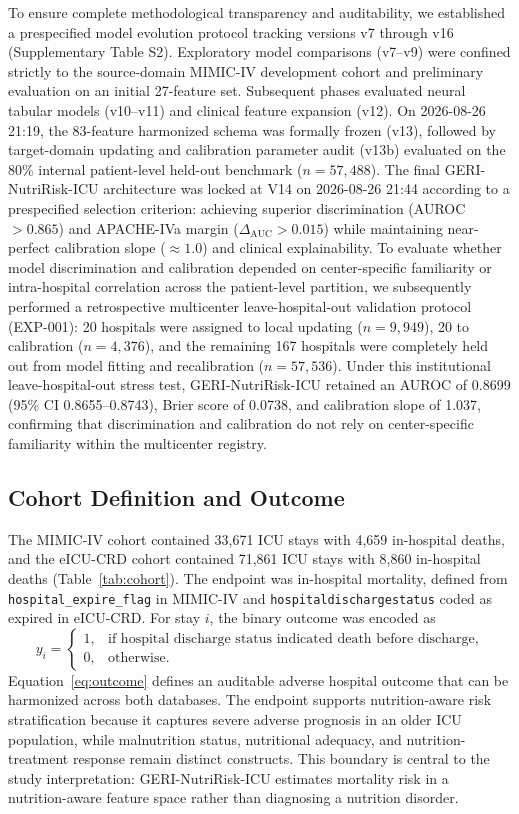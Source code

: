 \documentclass[utf8]{FrontiersinVancouver}
\newcommand{\re}[1]{#1}
\begin{document}
\re{To ensure complete methodological transparency and auditability, we established a prespecified model evolution protocol tracking versions v7 through v16 (Supplementary Table S2). Exploratory model comparisons (v7--v9) were confined strictly to the source-domain MIMIC-IV development cohort and preliminary evaluation on an initial 27-feature set. Subsequent phases evaluated neural tabular models (v10--v11) and clinical feature expansion (v12). On 2026-08-26 21:19, the 83-feature harmonized schema was formally frozen (v13), followed by target-domain updating and calibration parameter audit (v13b) evaluated on the 80\% internal patient-level held-out benchmark ($n=57,488$). The final GERI-NutriRisk-ICU architecture was locked at V14 on 2026-08-26 21:44 according to a prespecified selection criterion: achieving superior discrimination (AUROC $>0.865$) and APACHE-IVa margin ($\Delta_{\mathrm{AUC}}>0.015$) while maintaining near-perfect calibration slope ($\approx 1.0$) and clinical explainability. To evaluate whether model discrimination and calibration depended on center-specific familiarity or intra-hospital correlation across the patient-level partition, we subsequently performed a retrospective multicenter leave-hospital-out validation protocol (EXP-001): 20 hospitals were assigned to local updating ($n=9{,}949$), 20 to calibration ($n=4{,}376$), and the remaining 167 hospitals were completely held out from model fitting and recalibration ($n=57{,}536$). Under this institutional leave-hospital-out stress test, GERI-NutriRisk-ICU retained an AUROC of 0.8699 (95\% CI 0.8655--0.8743), Brier score of 0.0738, and calibration slope of 1.037, confirming that discrimination and calibration do not rely on center-specific familiarity within the multicenter registry.}

\subsection{Cohort Definition and Outcome}
The MIMIC-IV cohort contained 33,671 ICU stays with 4,659 in-hospital deaths, and the eICU-CRD cohort contained 71,861 ICU stays with 8,860 in-hospital deaths (Table~\ref{tab:cohort}). The endpoint was in-hospital mortality, defined from \texttt{hospital\_expire\_flag} in MIMIC-IV and \texttt{hospitaldischargestatus} coded as expired in eICU-CRD. For stay $i$, the binary outcome was encoded as
\begin{equation}
y_i =
\begin{cases}
1, & \text{if hospital discharge status indicated death before discharge},\\
0, & \text{otherwise}.
\end{cases}
\label{eq:outcome}
\end{equation}
Equation~\ref{eq:outcome} defines an auditable adverse hospital outcome that can be harmonized across both databases. The endpoint supports nutrition-aware risk stratification because it captures severe adverse prognosis in an older ICU population, while malnutrition status, nutritional adequacy, and nutrition-treatment response remain distinct constructs. This boundary is central to the study interpretation: GERI-NutriRisk-ICU estimates mortality risk in a nutrition-aware feature space rather than diagnosing a nutrition disorder.
\end{document}
